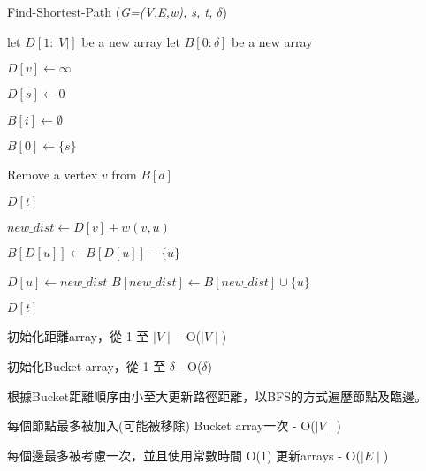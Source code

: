 \documentclass[UTF8, a4paper, 11pt]{report}
\begin{document}
\begin{algorithm}[H]
    \caption{Find-Shortest-Path (\textit{G=(V,E,w), s, t, $\delta$})}
    \begin{algorithmic}[1]
        \State let $D[1: |V|]$ be a new array 
        \State let $B[0: \delta]$ be a new array 

        \State $D[v] \gets \infty$  
        \EndFor

        \State $D[s] \gets 0$  

        \State $B[i] \gets \emptyset$  
        \EndFor

        \State $B[0] \gets \{s\}$  

        \State Remove a vertex $v$ from $B[d]$

        \State \Return $D[t]$  
        \EndIf

        \State $new\_dist \gets D[v] + w(v,u)$

         
        \State $B[D[u]] \gets B[D[u]] - \{u\}$
        \EndIf

        \State $D[u] \gets new\_dist$
        \State $B[new\_dist] \gets B[new\_dist] \cup \{u\}$

        \EndIf
        \EndFor
        \EndWhile
        \EndFor

        \State \Return $D[t]$  
    \end{algorithmic}
\end{algorithm}

初始化距離array，從 1 至 $\mid V\mid$ - O($\mid V\mid$)

初始化Bucket array，從 1 至 $\delta$ - O($\delta$)

根據Bucket距離順序由小至大更新路徑距離，以BFS的方式遍歷節點及臨邊。

每個節點最多被加入(可能被移除) Bucket array一次 - O($\mid V\mid$)

每個邊最多被考慮一次，並且使用常數時間 O(1) 更新arrays - O($\mid E\mid$)
\end{document}

